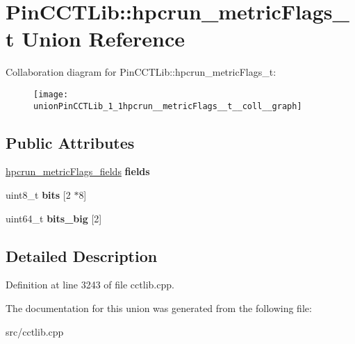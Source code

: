 \hypertarget{unionPinCCTLib_1_1hpcrun__metricFlags__t}{\section{Pin\-C\-C\-T\-Lib\-:\-:hpcrun\-\_\-metric\-Flags\-\_\-t Union Reference}
\label{unionPinCCTLib_1_1hpcrun__metricFlags__t}
}


Collaboration diagram for Pin\-C\-C\-T\-Lib\-:\-:hpcrun\-\_\-metric\-Flags\-\_\-t\-:
\nopagebreak
\begin{figure}[H]
\begin{center}
\leavevmode
\texttt{[image: unionPinCCTLib\_1\_1hpcrun\_\_metricFlags\_\_t\_\_coll\_\_graph]}
\end{center}
\end{figure}
\subsection*{Public Attributes}
\begin{DoxyCompactItemize}
\item 
\hypertarget{unionPinCCTLib_1_1hpcrun__metricFlags__t_ab33d425d34ce3c31483c202af79cf014}{\hyperlink{structPinCCTLib_1_1hpcrun__metricFlags__fields}{hpcrun\-\_\-metric\-Flags\-\_\-fields} {\bfseries fields}}\label{unionPinCCTLib_1_1hpcrun__metricFlags__t_ab33d425d34ce3c31483c202af79cf014}

\item 
\hypertarget{unionPinCCTLib_1_1hpcrun__metricFlags__t_a0d35f568478b431e129640fe8a7d659e}{uint8\-\_\-t {\bfseries bits} \mbox{[}2 $\ast$8\mbox{]}}\label{unionPinCCTLib_1_1hpcrun__metricFlags__t_a0d35f568478b431e129640fe8a7d659e}

\item 
\hypertarget{unionPinCCTLib_1_1hpcrun__metricFlags__t_aaeb1e02dd139e533447a4892be35a3bc}{uint64\-\_\-t {\bfseries bits\-\_\-big} \mbox{[}2\mbox{]}}\label{unionPinCCTLib_1_1hpcrun__metricFlags__t_aaeb1e02dd139e533447a4892be35a3bc}

\end{DoxyCompactItemize}


\subsection{Detailed Description}


Definition at line 3243 of file cctlib.\-cpp.



The documentation for this union was generated from the following file\-:\begin{DoxyCompactItemize}
\item 
src/cctlib.\-cpp\end{DoxyCompactItemize}
